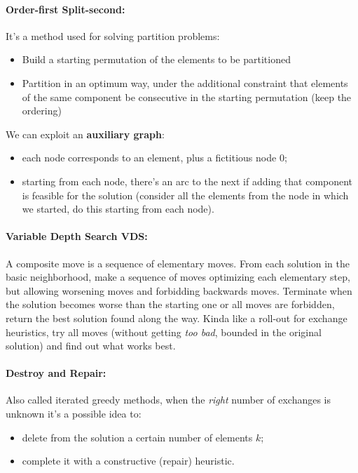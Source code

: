 \documentclass{article}
\begin{document}
	\paragraph{Order-first Split-second:} It's a method used for solving partition problems:
	\begin{itemize}
		\item Build a starting permutation of the elements to be partitioned
		\item Partition in an optimum way, under the additional constraint that elements of the same component be consecutive in the starting permutation (keep the ordering)
	\end{itemize}
	We can exploit an \textbf{auxiliary graph}: 
	\begin{itemize}
		\item each node corresponds to an element, plus a fictitious node $0$;
		\item starting from each node, there's an arc to the next if adding that component is feasible for the solution (consider all the elements from the node in which we started, do this starting from each node).\\
	\end{itemize}
	
	\paragraph{Variable Depth Search VDS:} A composite move is a sequence of elementary moves. From each solution in the basic neighborhood, make a sequence of moves optimizing each elementary step, but allowing worsening moves and forbidding backwards moves. Terminate when the solution becomes worse than the starting one or all moves are forbidden, return the best solution found along the way. Kinda like a roll-out for exchange heuristics, try all moves (without getting \textit{too bad}, bounded in the original solution) and find out what works best.\\
	
	\paragraph{Destroy and Repair:} Also called iterated greedy methods, when the \textit{right} number of exchanges is unknown it's a possible idea to:
	\begin{itemize}
		\item delete from the solution a certain number of elements $k$;
		\item complete it with a constructive (repair) heuristic.\\
	\end{itemize}
	
\end{document}
